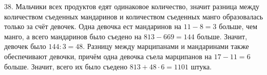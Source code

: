 38. Мальчики всех продуктов едят одинаковое количество, значит разница между количеством съеденных мандаринов и количеством съеденных манго образовалась только за счёт девочек. Одна девочка ест мандаринов на $11-8=3$ больше, чем манго, а всего мандаринов было съедено на $813-669=144$ больше. Значит, девочек было $144:3=48.$ Разницу между марципанами и мандаринами также обеспечивают девочки, причём одна девочка съела марципанов на $17-11=6$ больше. Значит, всего их было съедено $813+48\cdot6=1101$ штука.\\
